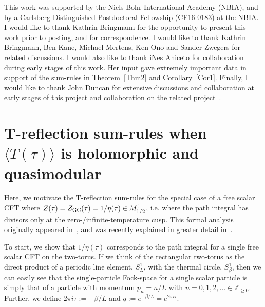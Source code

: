 \documentclass[11pt,a4paper]{article}
\def\Z{\mathbb{Z}}
\begin{document}
This work was supported by the Niels Bohr International Academy (NBIA), and by a Carlsberg Distinguished Postdoctoral Fellowship (CF16-0183) at the NBIA. I would like to thank Kathrin Bringmann for the opportunity to present this work prior to posting, and for correspondence. I would like to thank Kathrin Bringmann, Ben Kane, Michael Mertens, Ken Ono and Sander Zwegers for related discussions. 
I would also like to thank iNes Aniceto for collaboration during early stages of this work. Her input gave extremely important data in support of the sum-rules in Theorem~\ref{Thm2} and Corollary~\ref{Cor1}. Finally, I would like to thank John Duncan for extensive discussions and collaboration at early stages of this project and collaboration on the related project~\cite{30T-rex2-GL2}.

\appendix

\section{T-reflection sum-rules when $\langle T(\tau) \rangle$ is holomorphic and quasimodular}\label{secEg1}

Here, we motivate the T-reflection sum-rules for the special case of a free scalar CFT where $Z(\tau) = Z_{\rm GC}(\tau) = 1/\eta(\tau) \in M_{1/2}^!$, i.e. where the path integral has divisors only at the zero-/infinite-temperature cusp. This formal analysis originally appeared in~\cite{14T-rex0}, and was recently explained in greater detail in~\cite{06T-rex1}. 

To start, we show that $1/\eta(\tau)$ corresponds to the path integral for a single free scalar CFT on the two-torus. If we think of the rectangular two-torus as the direct product of a periodic line element,  $S^1_L$, with the thermal circle, $S^1_{\beta}$, then we can easily see that the single-particle Fock-space for a single scalar particle is simply that of a particle with momentum $p_n = n/L$ with $n = 0, 1, 2, \ldots \in \Z_{\geq 0}$. Further, we define $2 \pi i \tau:= -\beta/L$ and $q := e^{-\beta/L} = e^{2 \pi i \tau}$.
\end{document}
